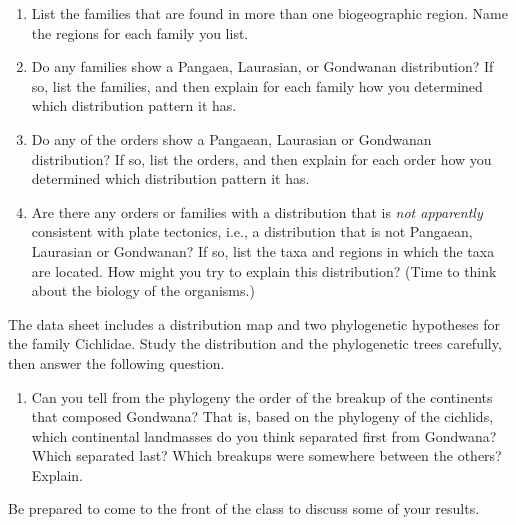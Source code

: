 \documentclass[11pt]{article}
\begin{document}
\begin{enumerate}[resume, leftmargin=*]
\begin{multicols}{2}
Least number of orders: \vspace{2\baselineskip}

 Greatest number of families: \vspace{2\baselineskip}
 
 Least number of families: \vspace{2\baselineskip}
 
 \end{multicols}
 
 \vspace{\baselineskip}
 
\item List the families that are found in more than one biogeographic region.
Name the regions for each family you list.

\item Do any families show a Pangaea, Laurasian, or Gondwanan distribution?
If so, list the families, and then explain for each family how you
determined which distribution pattern it has.

\newpage
\item Do any of the orders show a Pangaean, Laurasian or Gondwanan
distribution? If so, list the orders, and then explain for each order
how you determined which distribution pattern it has.

\item Are there any orders or families with a distribution that is
\emph{not apparently} consistent with plate tectonics, i.e., a
distribution that is not Pangaean, Laurasian or Gondwanan? If so, list
the taxa and regions in which the taxa are located. How might you try to
explain this distribution? (Time to think about the biology of the
organisms.)

\end{enumerate}

\newpage

The data sheet includes a distribution map and two phylogenetic
hypotheses for the family Cichlidae. Study the distribution and the
phylogenetic trees carefully, then answer the following question.

\begin{enumerate}[resume, leftmargin=*]
\item Can you tell from the phylogeny the order of the breakup of the
continents that composed Gondwana? That is, based on the phylogeny of
the cichlids, which continental landmasses do you think separated first
from Gondwana? Which separated last? Which breakups were somewhere
between the others? Explain.

\end{enumerate}

Be prepared to come to the front of the class to discuss some of your
results.
\end{document}
